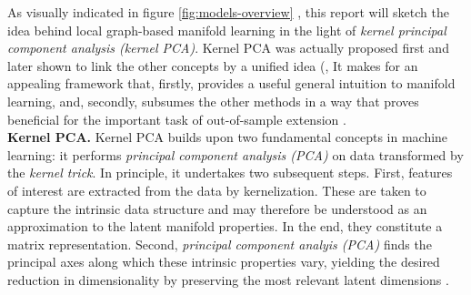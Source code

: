 As visually indicated in figure \ref{fig:models-overview} , this report will 
sketch the idea behind local graph-based manifold learning in the light of 
\textit{kernel principal component analysis (kernel PCA)}.
Kernel PCA was actually proposed first and later shown to link the other 
concepts by a unified idea (\citet{hametal2003},
It makes for an appealing framework that, firstly, provides a useful general 
intuition to manifold learning, and, secondly, subsumes the other methods in a 
way that proves beneficial for the important task of out-of-sample extension \citep{bengioetal2004}.
\\

\textbf{Kernel PCA.} Kernel PCA builds upon two fundamental concepts 
in machine learning: it performs \textit{principal component analysis (PCA)} on 
data transformed by the \textit{kernel trick}.
In principle, it undertakes two subsequent steps.
First, features of interest are extracted from the data by kernelization. 
These are taken to capture the intrinsic data structure and may therefore be 
understood as an approximation to the latent manifold properties.
In the end, they constitute a matrix representation.
Second, \textit{principal component analyis (PCA)} finds the principal axes 
along which these intrinsic properties vary, yielding the desired reduction in 
dimensionality by preserving the most relevant latent dimensions \citep{schoelkopfetal1998}.

